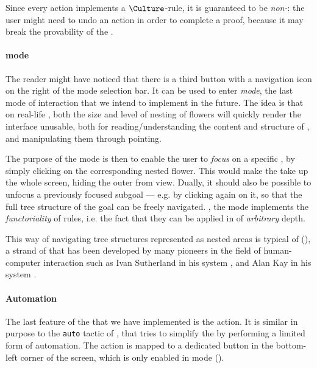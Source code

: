 \begin{scope}
Since every \Edit action implements a $\Culture$-rule, it is guaranteed to be
\emph{non-}: the user might need to undo an \Edit action in order to
complete a proof, because it may break the provability of the .

\paragraph{\Navigation mode}

The reader might have noticed that there is a third button with a navigation
icon on the right of the mode selection bar. It can be used to enter
\emph{\Navigation mode}, the last mode of interaction that we intend to implement
in the future. The idea is that on real-life , both the size and level of
nesting of flowers will quickly render the interface unusable, both for
reading/understanding the content and structure of , and manipulating them
through pointing.

The purpose of the \Navigation mode is then to enable the user to \emph{focus} on
a specific , by simply clicking on the corresponding nested flower. This
would make the  take up the whole screen, hiding the outer  from
view. Dually, it should also be possible to unfocus a previously focused subgoal
--- e.g. by clicking again on it, so that the full tree structure of the goal
can be freely navigated. , the \Navigation mode implements the
\emph{functoriality} of rules, i.e. the fact that they can be applied in
 of \emph{arbitrary} depth.

\begin{remark}
This way of navigating tree structures represented as nested areas is typical of
 (), a strand of  that has been developed
by many pioneers in the field of human-computer interaction such as Ivan
Sutherland in his  system , and
Alan Kay in his  system
.
\end{remark}

\paragraph{Automation}

The last feature of the  that we have implemented is the
 \Proof action. It is similar in purpose to the \texttt{auto}
tactic of , that tries to simplify the  by performing a limited form of
automation. The  action is mapped to a dedicated button in the
bottom-left corner of the screen, which is only enabled in \Proof mode
().


\end{scope}
